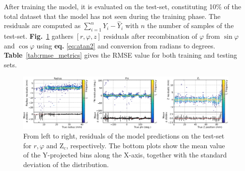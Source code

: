 After training the model, it is evaluated on the test-set, constituting 10\% of the total dataset that the model has not seen during the training phase. The residuals are computed as $\sum_{i=1}^n Y_i - \hat Y_i$ 
with $n$ the number of samples of the test-set. \textbf{Fig.}~\ref{fig:all_residuals} gathers $[r, \varphi,z]$ residuals after recombination of $\varphi$ from $\sin \varphi$ and $\cos \varphi$ using \textbf{eq.} \ref{eq:atan2} and conversion from radians to degrees. \textbf{Table}~\ref{tab:rmse_metrics} gives the RMSE value for both training and testing sets.
\begin{figure}
\includegraphics[width=\textwidth]{images/residuals_subplots_grouped.eps}
\caption{From left to right, residuals of the model predictions on the test-set for $r, \varphi$ and $\text{Z}_\text{c}$, respectively. The bottom plots show the mean value of the Y-projected bins along the X-axis, together with the standard deviation of the distribution.}
\label{fig:all_residuals}       %
\end{figure}

